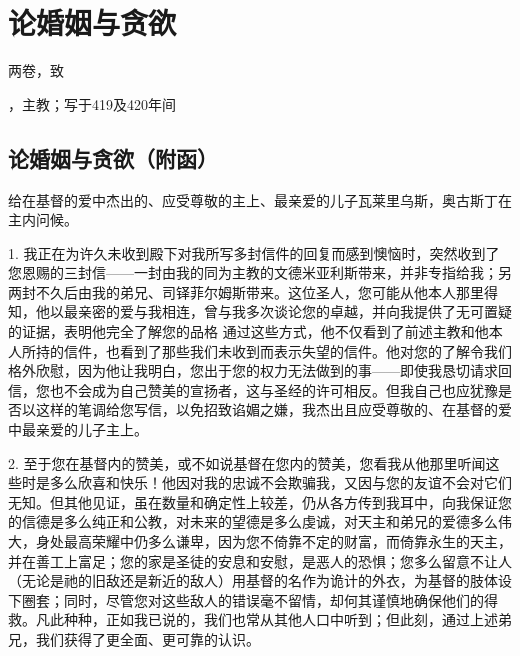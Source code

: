 
\chapter{论婚姻与贪欲}


两卷，致\par

，主教；写于419及420年间\par



\section{论婚姻与贪欲（附函）}

\par

给在基督的爱中杰出的、应受尊敬的主上、最亲爱的儿子瓦莱里乌斯，奥古斯丁在主内问候。\par

1. 我正在为许久未收到殿下对我所写多封信件的回复而感到懊恼时，突然收到了您恩赐的三封信——一封由我的同为主教的文德米亚利斯带来，并非专指给我；另两封不久后由我的弟兄、司铎菲尔姆斯带来。这位圣人，您可能从他本人那里得知，他以最亲密的爱与我相连，曾与我多次谈论您的卓越，并向我提供了无可置疑的证据，表明他完全了解您的品格 通过这些方式，他不仅看到了前述主教和他本人所持的信件，也看到了那些我们未收到而表示失望的信件。他对您的了解令我们格外欣慰，因为他让我明白，您出于您的权力无法做到的事——即使我恳切请求回信，您也不会成为自己赞美的宣扬者，这与圣经的许可相反。但我自己也应犹豫是否以这样的笔调给您写信，以免招致谄媚之嫌，我杰出且应受尊敬的、在基督的爱中最亲爱的儿子主上。\par

2. 至于您在基督内的赞美，或不如说基督在您内的赞美，您看我从他那里听闻这些时是多么欣喜和快乐！他因对我的忠诚不会欺骗我，又因与您的友谊不会对它们无知。但其他见证，虽在数量和确定性上较差，仍从各方传到我耳中，向我保证您的信德是多么纯正和公教，对未来的望德是多么虔诚，对天主和弟兄的爱德多么伟大，身处最高荣耀中仍多么谦卑，因为您不倚靠不定的财富，而倚靠永生的天主，并在善工上富足；您的家是圣徒的安息和安慰，是恶人的恐惧；您多么留意不让人（无论是祂的旧敌还是新近的敌人）用基督的名作为诡计的外衣，为基督的肢体设下圈套；同时，尽管您对这些敌人的错误毫不留情，却何其谨慎地确保他们的得救。凡此种种，正如我已说的，我们也常从其他人口中听到；但此刻，通过上述弟兄，我们获得了更全面、更可靠的认识。\par

